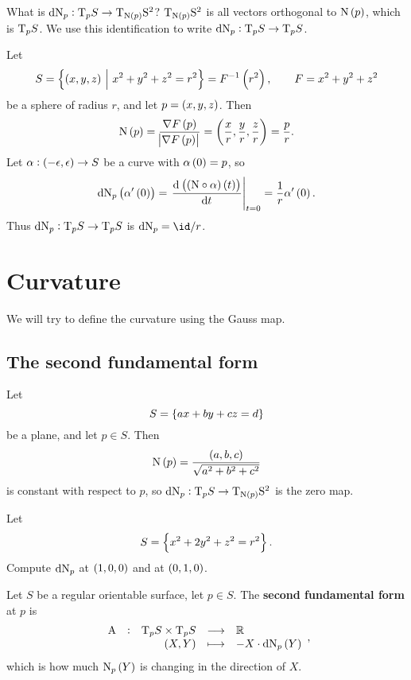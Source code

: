 What is $ \d\N_p : \T_p S \to \T_{\N\br{p}} \S^2 $? $ \T_{\N\br{p}} \S^2 $ is all vectors orthogonal to $ \N\br{p} $, which is $ \mathrm{T}_p S $. We use this identification to write $ \mathrm{d}\mathrm{N}_p : \mathrm{T}_p S \to \mathrm{T}_p S $.

\begin{example*}
Let
$$ S = \cbr{\br{x, y, z} \st x^2 + y^2 + z^2 = r^2} = F^{-1}\br{r^2}, \qquad F = x^2 + y^2 + z^2 $$
be a sphere of radius $ r $, and let $ p = \br{x, y, z} $. Then
$$ \N\br{p} = \dfrac{\nabla F\br{p}}{\abs{\nabla F\br{p}}} = \br{\dfrac{x}{r}, \dfrac{y}{r}, \dfrac{z}{r}} = \dfrac{p}{r}. $$
Let $ \alpha : \br{-\epsilon, \epsilon} \to S $ be a curve with $ \alpha\br{0} = p $, so
$$ \d\N_p\br{\alpha'\br{0}} = \eval{\dod{\br{\br{\N \circ \alpha}\br{t}}}{t}}_{t = 0} = \dfrac{1}{r}\alpha'\br{0}. $$
Thus $ \mathrm{d}\mathrm{N}_p : \mathrm{T}_p S \to \mathrm{T}_p S $ is $ \d\N_p = \id / r $.
\end{example*}

\pagebreak

\section{Curvature}


We will try to define the curvature using the Gauss map.

\subsection{The second fundamental form}

\begin{example*}
Let
$$ S = \cbr{ax + by + cz = d} $$
be a plane, and let $ p \in S $. Then
$$ \N\br{p} = \dfrac{\br{a, b, c}}{\sqrt{a^2 + b^2 + c^2}} $$
is constant with respect to $ p $, so $ \d\N_p : \T_p S \to \T_{\N\br{p}} \S^2 $ is the zero map.
\end{example*}

\begin{exercise*}
Let
$$ S = \cbr{x^2 + 2y^2 + z^2 = r^2}. $$
Compute $ \mathrm{d}\mathrm{N}_p $ at $ \br{1, 0, 0} $ and at $ \br{0, 1, 0} $.
\end{exercise*}

\begin{definition}
Let $ S $ be a regular orientable surface, let $ p \in S $. The \textbf{second fundamental form} at $ p $ is
$$ \function[\A]{\T_p S \times \T_p S}{\RR}{\br{X, Y}}{-X \cdot \d\N_p\br{Y}}, $$
which is how much $ \N_p\br{Y} $ is changing in the direction of $ X $.
\end{definition}

